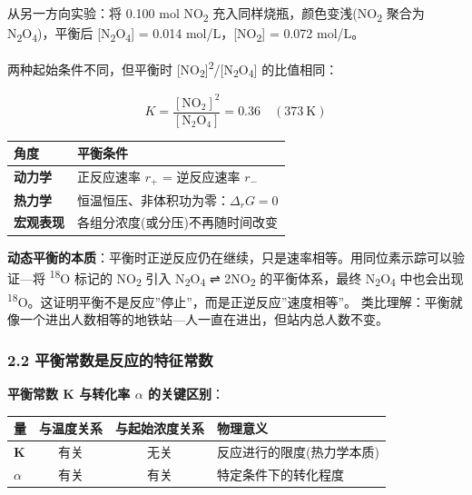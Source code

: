 \documentclass[a4paper,11pt]{ctexart}
\newcounter{none}
\begin{document}
从另一方向实验：将 0.100 mol NO\textsubscript{2} 充入同样烧瓶，颜色变浅(NO\textsubscript{2} 聚合为 N\textsubscript{2}O\textsubscript{4})，平衡后 {[}N\textsubscript{2}O\textsubscript{4}{]} = 0.014 mol/L，{[}NO\textsubscript{2}{]} = 0.072 mol/L。

两种起始条件不同，但平衡时 {[}NO\textsubscript{2}{]}\textsuperscript{2}/{[}N\textsubscript{2}O\textsubscript{4}{]} 的比值相同：

\[
K = \frac{[\mathrm{NO_2}]^2}{[\mathrm{N_2O_4}]} = 0.36 \quad (373\ \mathrm{K})
\]

{\def\LTcaptype{none} %
\begin{longtable}[]{@{}ll@{}}
\toprule\noalign{}
角度 & 平衡条件 \\
\midrule\noalign{}
\endhead
\bottomrule\noalign{}
\endlastfoot
\textbf{动力学} & 正反应速率 \(r_+\) = 逆反应速率 \(r_-\) \\
\textbf{热力学} & 恒温恒压、非体积功为零：\(\Delta_rG = 0\) \\
\textbf{宏观表现} & 各组分浓度(或分压)不再随时间改变 \\
\end{longtable}
}

\textbf{动态平衡的本质}：平衡时正逆反应仍在继续，只是速率相等。用同位素示踪可以验证---将 \textsuperscript{18}O 标记的 NO\textsubscript{2} 引入 N\textsubscript{2}O\textsubscript{4} ⇌ 2NO\textsubscript{2} 的平衡体系，最终 N\textsubscript{2}O\textsubscript{4} 中也会出现 \textsuperscript{18}O。这证明平衡不是反应''停止''，而是正逆反应''速度相等''。
类比理解：平衡就像一个进出人数相等的地铁站---人一直在进出，但站内总人数不变。

\subsubsection{2.2 平衡常数是反应的特征常数}\label{ux5e73ux8861ux5e38ux6570ux662fux53cdux5e94ux7684ux7279ux5f81ux5e38ux6570}

\textbf{平衡常数 K 与转化率 \(\alpha\) 的关键区别}：

{\def\LTcaptype{none} %
\begin{longtable}[]{@{}lccl@{}}
\toprule\noalign{}
量 & 与温度关系 & 与起始浓度关系 & 物理意义 \\
\midrule\noalign{}
\endhead
\bottomrule\noalign{}
\endlastfoot
\textbf{K} & 有关 & 无关 & 反应进行的限度(热力学本质) \\
\textbf{\(\alpha\)} & 有关 & 有关 & 特定条件下的转化程度 \\
\end{longtable}
}
\end{document}
